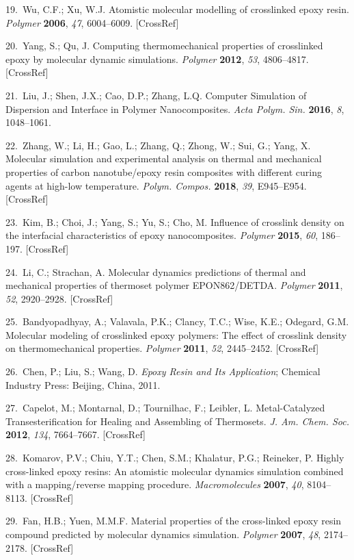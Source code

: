 \documentclass{article}
\begin{document}
\begin{hangpars}
19.\ Wu, C.F.; Xu, W.J. Atomistic molecular modelling of crosslinked epoxy resin. \emph{Polymer} \textbf{2006}, \emph{47}, 6004–6009. [CrossRef]

20.\ Yang, S.; Qu, J. Computing thermomechanical properties of crosslinked epoxy by molecular dynamic simulations. \emph{Polymer} \textbf{2012}, \emph{53}, 4806–4817. [CrossRef]

21.\ Liu, J.; Shen, J.X.; Cao, D.P.; Zhang, L.Q. Computer Simulation of Dispersion and Interface in Polymer Nanocomposites. \emph{Acta Polym. Sin.} \textbf{2016}, \emph{8}, 1048–1061.

22.\ Zhang, W.; Li, H.; Gao, L.; Zhang, Q.; Zhong, W.; Sui, G.; Yang, X. Molecular simulation and experimental analysis on thermal and mechanical properties of carbon nanotube/epoxy resin composites with different curing agents at high-low temperature. \emph{Polym. Compos.} \textbf{2018}, \emph{39}, E945–E954. [CrossRef]

23.\ Kim, B.; Choi, J.; Yang, S.; Yu, S.; Cho, M. Influence of crosslink density on the interfacial characteristics of epoxy nanocomposites. \emph{Polymer} \textbf{2015}, \emph{60}, 186–197. [CrossRef]

24.\ Li, C.; Strachan, A. Molecular dynamics predictions of thermal and mechanical properties of thermoset polymer EPON862/DETDA. \emph{Polymer} \textbf{2011}, \emph{52}, 2920–2928. [CrossRef]

25.\ Bandyopadhyay, A.; Valavala, P.K.; Clancy, T.C.; Wise, K.E.; Odegard, G.M. Molecular modeling of crosslinked epoxy polymers: The effect of crosslink density on thermomechanical properties. \emph{Polymer} \textbf{2011}, \emph{52}, 2445–2452. [CrossRef]

26.\ Chen, P.; Liu, S.; Wang, D. \emph{Epoxy Resin and Its Application}; Chemical Industry Press: Beijing, China, 2011.

27.\ Capelot, M.; Montarnal, D.; Tournilhac, F.; Leibler, L. Metal-Catalyzed Transesterification for Healing and Assembling of Thermosets. \emph{J. Am. Chem. Soc.} \textbf{2012}, \emph{134}, 7664–7667. [CrossRef]

28.\ Komarov, P.V.; Chiu, Y.T.; Chen, S.M.; Khalatur, P.G.; Reineker, P. Highly cross-linked epoxy resins: An atomistic molecular dynamics simulation combined with a mapping/reverse mapping procedure. \emph{Macromolecules} \textbf{2007}, \emph{40}, 8104–8113. [CrossRef]

29.\ Fan, H.B.; Yuen, M.M.F. Material properties of the cross-linked epoxy resin compound predicted by molecular dynamics simulation. \emph{Polymer} \textbf{2007}, \emph{48}, 2174–2178. [CrossRef]


\end{hangpars}
\end{document}

